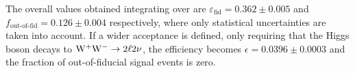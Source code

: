 The overall values obtained integrating over \pth are $\varepsilon_\mathrm{fid}=0.362\pm{0.005}$ and $f_{\text{out-of-fid}}=0.126\pm0.004$ respectively, where only statistical uncertainties are taken into account.
If a wider acceptance is defined, only requiring that the Higgs boson decays to $\mathrm{W^+W^-} \to 2\ell2\nu$, the efficiency becomes $\epsilon=0.0396\pm{0.0003}$ and the fraction of out-of-fiducial signal events is zero. 





